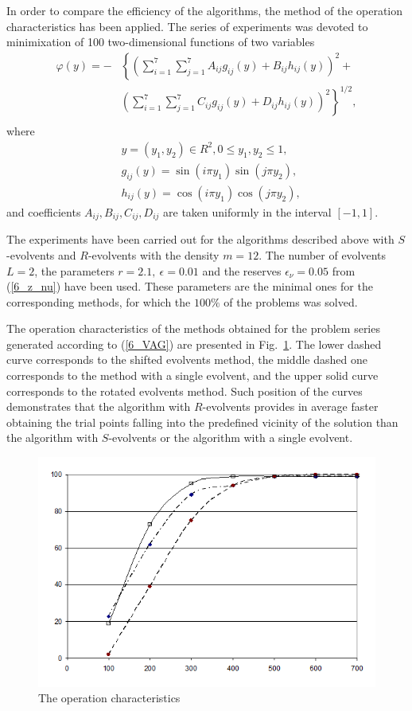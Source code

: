 \begin{example}

In order to compare the efficiency of the algorithms, the method of the operation characteristics has been applied. The series of experiments was devoted to minimixation of 100 two-dimensional functions of two variables
\begin{eqnarray} \label{6_VAG}
\varphi(y)= -&\left\{\left(\sum^{7}_{i=1}\sum^{7}_{j=1}A_{ij}g_{ij}(y)+B_{ij}h_{ij}(y)\right)^2+\right. \\
&\left.\left(\sum^{7}_{i=1}\sum^{7}_{j=1}C_{ij}g_{ij}(y)+D_{ij}h_{ij}(y)\right)^2\right\}^{1/2},\\ \nonumber
\end{eqnarray}
where
\begin{eqnarray} \nonumber
& y=(y_1,y_2)\in R^2, 0 \leq y_1,y_2 \leq 1, \\ \nonumber
& g_{ij}(y)=\sin(i\pi y_1)\sin(j\pi y_2),  \\ \nonumber
& h_{ij}(y)=\cos(i\pi y_1)\cos(j\pi y_2), \nonumber 
\end{eqnarray}
and coefficients $A_{ij}, B_{ij}, C_{ij}, D_{ij}$  are taken uniformly in the interval $[-1,1]$.

The experiments have been carried out for the algorithms described above with $S$-evolvents and $R$-evolvents  with the density $m = 12$. The number of evolvents $L = 2$, the parameters $r=2.1,\ \epsilon = 0.01$ and the reserves $\epsilon_\nu= 0.05$ from (\ref{6_z_nu}) have been used. These parameters are the minimal ones for the corresponding methods, for which the $100\%$ of the problems was solved. 

The operation characteristics of the methods obtained for the problem series generated according to (\ref{6_VAG}) are presented in Fig.~\ref{6_fig_11}. The lower dashed curve corresponds to the shifted evolvents method, the middle dashed one corresponds to the method with a single evolvent, and the upper solid curve corresponds to the rotated evolvents method. Such position of the curves demonstrates that the algorithm with $R$-evolvents provides in average faster obtaining the trial points falling into the predefined vicinity of the solution than the algorithm with $S$-evolvents  or the algorithm with a single evolvent.

\begin{figure}[t]
\includegraphics[width=0.8\linewidth]{figures/6_11.png}
\caption{The operation characteristics}
\label{6_fig_11}     
\end{figure}


\end{example}
